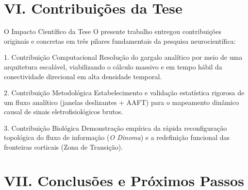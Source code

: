 \documentclass[10pt]{beamer}
\begin{document}
\section{VI. Contribuições da Tese}

\begin{frame}{O Impacto Científico da Tese}
    \justifying
    O presente trabalho entregou contribuições originais e concretas em três pilares fundamentais da pesquisa neurocientífica:
    
    \vspace{0.3cm}
    \begin{alertblock}{1. Contribuição Computacional}
        Resolução do gargalo analítico por meio de uma arquitetura escalável, viabilizando o cálculo massivo e em tempo hábil da conectividade direcional em alta densidade temporal.
    \end{alertblock}

    \vspace{0.1cm}
    \begin{alertblock}{2. Contribuição Metodológica}
        Estabelecimento e validação estatística rigorosa de um fluxo analítico (janelas deslizantes + AAFT) para o mapeamento dinâmico causal de sinais eletrofisiológicos brutos.
    \end{alertblock}

    \vspace{0.1cm}
    \begin{alertblock}{3. Contribuição Biológica}
        Demonstração empírica da rápida reconfiguração topológica do fluxo de informação (\textit{O Dinoma}) e a redefinição funcional das fronteiras corticais (Zona de Transição).
    \end{alertblock}
\end{frame}


\section{VII. Conclusões e Próximos Passos}
\end{document}
